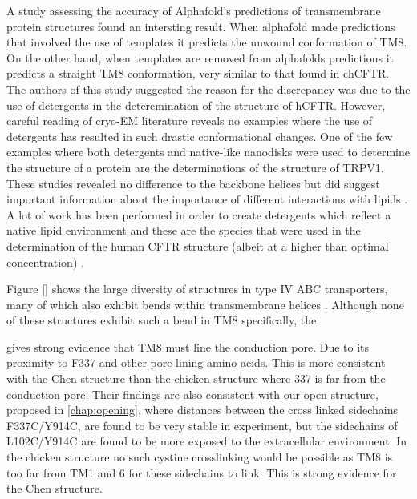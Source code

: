 A study assessing the accuracy of Alphafold's predictions of transmembrane protein structures found an intersting result. When alphafold made predictions that involved the use of templates it predicts the unwound conformation of TM8. On the other hand, when templates are removed from alphafolds predictions it predicts a straight TM8 conformation, very similar to that found in chCFTR. The authors of this study suggested the reason for the discrepancy was due to the use of detergents in the deteremination of the structure of hCFTR. However, careful reading of cryo-EM literature reveals no examples where the use of detergents has resulted in such drastic conformational changes. One of the few examples where both detergents and native-like nanodisks were used to determine the structure of a protein are the determinations of the structure of TRPV1. These studies revealed no difference to the backbone helices but did suggest important information about the importance of different interactions with lipids \cite{gao2016}. A lot of work has been performed in order to create detergents which reflect a native lipid environment and these are the species that were used in the determination of the human CFTR structure (albeit at a higher than optimal concentration) \cite{gao2016, zhang2018, kampjut2021}. 


Figure \ref{} shows the large diversity of structures in type IV ABC transporters, many of which also exhibit bends within transmembrane helices \cite{thomas2020}. Although none of these structures exhibit such a bend in TM8 specifically, the 

\cite{negoda2019} gives strong evidence that TM8 must line the conduction pore. Due to its proximity to F337 and other pore lining amino acids. This is more consistent with the Chen structure than the chicken structure where 337 is far from the conduction pore. Their findings are also consistent with our open structure, proposed in \ref{chap:opening}, where distances between the cross linked sidechains F337C/Y914C, are found to be very stable in experiment, but the sidechains of L102C/Y914C are found to be more exposed to the extracellular environment. In the chicken structure no such cystine crosslinking would be possible as TM8 is too far from TM1 and 6 for these sidechains to link. This is strong evidence for the Chen structure.

